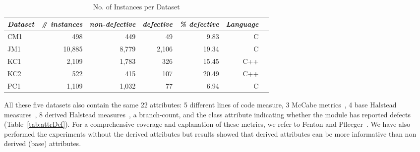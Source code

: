 \documentclass{elsart}
\begin{document}

\begin{table}%
\begin{center}
\begin{small}
 \caption{No. of Instances per Dataset}
\begin{tabular}{l|rrrrrr}
\hline
 \emph{Dataset} & \emph{\# instances} & \emph{non-defective} & \emph{defective} & \emph{\% defective} & \emph{Language}\\
\hline \hline
       CM1 &    498 &   449 &    49 &  9.83 & C \\
       JM1 & 10,885 & 8,779 & 2,106 & 19.34 & C \\
       KC1 &  2,109 & 1,783 &   326 & 15.45 & C++ \\
       KC2 &    522 &   415 &   107 & 20.49 & C++ \\
       PC1 &  1,109 & 1,032 &    77 &  6.94 & C \\
\hline
\end{tabular}
\end{small}
 \label{tab:attr}
 \end{center}
\end{table}


All these five datasets also contain the same 22 attributes: 5 different lines of code measure, 3 McCabe metrics~\cite{mccabe76}, 4 base Halstead measures~\cite{halstead77}, 8 derived Halstead measures~\cite{halstead77}, a branch-count, and the class attribute
indicating whether the module has reported defects (Table~\ref{tab:attrDef}). For a comprehensive coverage and explanation of these metrics, we refer to Fenton and Pfleeger~\cite{fenton97}. We have also performed the experiments without the derived attributes but results showed that derived attributes can be more informative than non derived (base) attributes.
\end{document}
